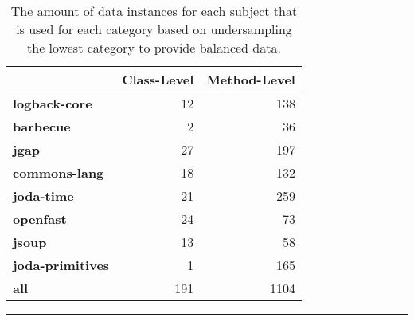 \begin{table}[!ht]
  \centering
  \begin{threeparttable}
    \begin{tabular}{|l|r|r|}
      \rowcolor[RGB]{169,196,223}
      \hline & \textbf{Class-Level} & \textbf{Method-Level} \\
      \hline \cellcolor[RGB]{169,196,223} \textbf{logback-core} & 12 & 138 \\
      \hline \cellcolor[RGB]{169,196,223} \textbf{barbecue} & 2 & 36 \\
      \hline \cellcolor[RGB]{169,196,223} \textbf{jgap} & 27 & 197 \\
      \hline \cellcolor[RGB]{169,196,223} \textbf{commons-lang} & 18 & 132 \\
      \hline \cellcolor[RGB]{169,196,223} \textbf{joda-time} & 21 & 259 \\
      \hline \cellcolor[RGB]{169,196,223} \textbf{openfast} & 24 & 73 \\
      \hline \cellcolor[RGB]{169,196,223} \textbf{jsoup} & 13 & 58 \\
      \hline \cellcolor[RGB]{169,196,223} \textbf{joda-primitives} & 1 & 165 \\
      \hline \cellcolor[RGB]{169,196,223} \textbf{all} & 191 & 1104 \\
      \hline
    \end{tabular}
  \end{threeparttable}
  \caption{The amount of data instances for each subject that is used for each category based on undersampling the lowest category to provide balanced data.}
  \vspace{2mm}
  \hrule
  \label{tab:experiments_undersampled_data}
\end{table}

